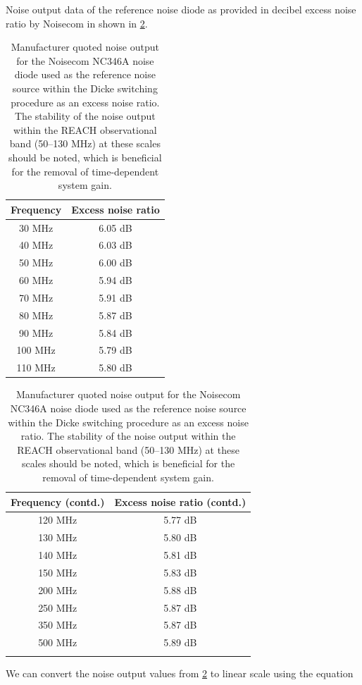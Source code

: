Noise output data of the reference noise diode as provided in decibel excess noise ratio by Noisecom in shown in \cref{tab:ns_noise}.
\begin{table}
    \begin{center}
    \begin{tabular}{ |c|c| }
        \hline
        {Frequency} & {Excess noise ratio} \\
        \hline
        30 MHz & 6.05 dB \\
        40 MHz & 6.03 dB \\
        50 MHz & 6.00 dB \\
        60 MHz & 5.94 dB \\
        70 MHz & 5.91 dB \\
        80 MHz & 5.87 dB \\
        90 MHz & 5.84 dB \\
        100 MHz & 5.79 dB \\
        110 MHz & 5.80 dB \\
        \hline
    \end{tabular}
    \quad
    \begin{tabular}{ |c|c| }
        \hline
        {Frequency (contd.)} & {Excess noise ratio (contd.)} \\
        \hline
        120 MHz & 5.77 dB \\
        130 MHz & 5.80 dB \\
        140 MHz & 5.81 dB \\
        150 MHz & 5.83 dB \\
        200 MHz & 5.88 dB \\
        250 MHz & 5.87 dB \\
        350 MHz & 5.87 dB \\
        500 MHz & 5.89 dB \\
         & \\
        \hline
    \end{tabular}
    \end{center}
    \caption{Manufacturer quoted noise output for the Noisecom NC346A noise diode used as the reference noise source within the Dicke switching procedure as an excess noise ratio. The stability of the noise output within the REACH observational band (50--130 MHz) at these scales should be noted, which is beneficial for the removal of time-dependent system gain.}
    \label{tab:ns_noise}
\end{table}
We can convert the noise output values from \cref{tab:ns_noise} to linear scale using the equation
